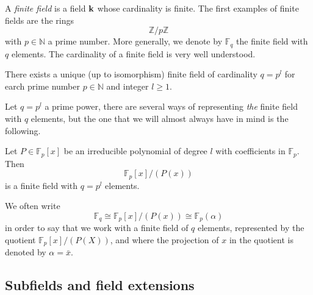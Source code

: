 A \emph{finite field} is a field $\mathbf{k}$ whose cardinality is finite. The first
examples of finite fields are the rings 
\[
  \mathbb{Z}/p\mathbb{Z}
\]
with $p\in\mathbb{N}$ a prime number. More generally, we denote by
$\mathbb{F}_{q}$ the finite field with $q$ elements. The cardinality of a finite
field is very well understood.
\begin{prop}
 There exists a unique (up to isomorphism) finite field of cardinality $q = p^l$
 for earch prime number $p\in\mathbb{N}$ and integer $l\geq1$.
\end{prop}
Let $q=p^l$ a prime power, there are several ways of representing
\emph{the} finite field with $q$ elements, but the one that we will almost
always have in mind is the following.

\begin{prop}
Let $P\in\mathbb{F}_p[x]$ be an
irreducible polynomial of degree $l$ with coefficients in $\mathbb{F}_p$. Then
\[
  \mathbb{F}_p[x]/(P(x))
\]
is a finite field with $q = p^l$ elements.
\end{prop}
We often write
\[
  \mathbb{F}_q \cong \mathbb{F}_{p}[x]/(P(x))\cong \mathbb{F}_p(\alpha)
\]
in order to say that we work with a finite field of $q$ elements, represented by
the quotient $\mathbb{F}_{p}[x]/(P(X))$, and where the projection of $x$ in the
quotient is denoted by $\alpha=\bar x$.

\subsection{Subfields and field extensions}

